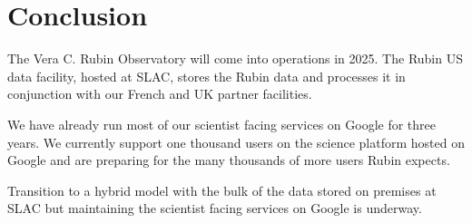 \section{Conclusion} \label{sec:conc}
The Vera C. Rubin Observatory will come into operations in 2025.
The Rubin US data facility, hosted at SLAC, stores the Rubin data and processes it in conjunction with our French and UK partner facilities.

We have already run most of our scientist facing services on Google for three years.
We currently support one thousand users on the science platform hosted on Google and are preparing for the many thousands of more users Rubin expects.

Transition to a hybrid model with the bulk of the data stored on premises at SLAC but maintaining the scientist facing services on Google is underway.

